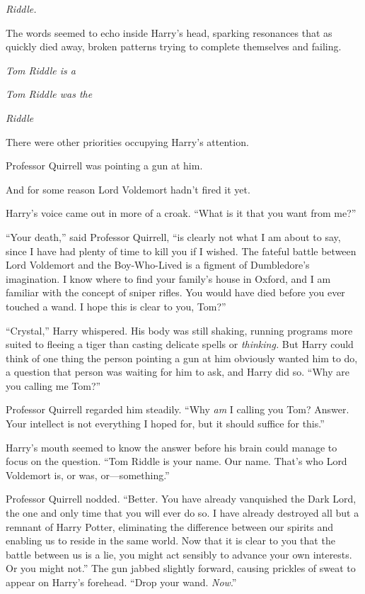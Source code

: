 
 \emph{Riddle.}

\quad\quad
The words seemed to echo inside Harry’s head, sparking resonances that as quickly died away, broken patterns trying to complete themselves and failing.

\emph{Tom Riddle is a}

\emph{Tom Riddle was the}

\emph{Riddle}

There were other priorities occupying Harry’s attention.

Professor Quirrell was pointing a gun at him.

And for some reason Lord Voldemort hadn’t fired it yet.

Harry’s voice came out in more of a croak. “What is it that you want from me?”

“Your death,” said Professor Quirrell, “is clearly not what I am about to say, since I have had plenty of time to kill you if I wished. The fateful battle between Lord Voldemort and the Boy-Who-Lived is a figment of Dumbledore’s imagination. I know where to find your family’s house in Oxford, and I am familiar with the concept of sniper rifles. You would have died before you ever touched a wand. I hope this is clear to you, Tom?”

“Crystal,” Harry whispered. His body was still shaking, running programs more suited to fleeing a tiger than casting delicate spells or \emph{thinking.} But Harry could think of one thing the person pointing a gun at him obviously wanted him to do, a question that person was waiting for him to ask, and Harry did so. “Why are you calling me Tom?”

Professor Quirrell regarded him steadily. “Why \emph{am} I calling you Tom? Answer. Your intellect is not everything I hoped for, but it should suffice for this.”

Harry’s mouth seemed to know the answer before his brain could manage to focus on the question. “Tom Riddle is your name. Our name. That’s who Lord Voldemort is, or was, or—something.”

Professor Quirrell nodded. “Better. You have already vanquished the Dark Lord, the one and only time that you will ever do so. I have already destroyed all but a remnant of Harry Potter, eliminating the difference between our spirits and enabling us to reside in the same world. Now that it is clear to you that the battle between us is a lie, you might act sensibly to advance your own interests. Or you might not.” The gun jabbed slightly forward, causing prickles of sweat to appear on Harry’s forehead. “Drop your wand. \emph{Now}.”

